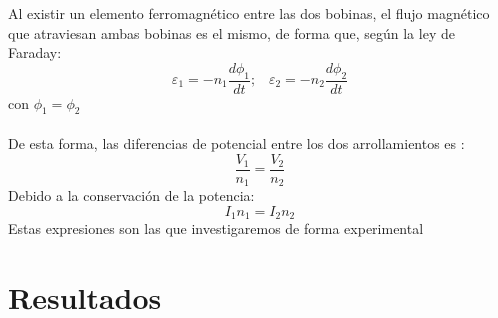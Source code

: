 \documentclass[11pt,letterpaper,twocolumn]{article}
\begin{document}
Al existir un elemento ferromagnético entre las dos bobinas, el flujo magnético  que atraviesan ambas bobinas es el mismo, de forma que, según la ley de Faraday:
\begin{equation}
	\varepsilon_1=-n_1 \frac{d \phi_1 }{d t}; \; \; \;  \varepsilon_2=-n_2 \frac{d \phi_2}{d t}
\end{equation}
con $\phi_1= \phi_2$ \\
\\
De esta forma, las diferencias de potencial entre  los dos arrollamientos es :
\begin{equation}
	\frac{V_1}{n_1}=\frac{V_2}{n_2}
\end{equation}
Debido a la conservación de la potencia:
\begin{equation}
	I_1n_1=I_2n_2		
\end{equation}
Estas expresiones  son las que  investigaremos de forma experimental
\section{Resultados}%
\label{sec:}
\end{document}
